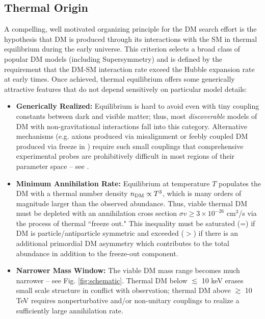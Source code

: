 \documentclass{article}
\begin{document}
\subsection{Thermal Origin}
A compelling, well motivated organizing principle for the DM search effort is the hypothesis that DM
is produced through its interactions with the SM in thermal equilibrium during the early universe. This criterion
selects a broad class of popular DM models (including Supersymmetry) and is defined by the requirement that the DM-SM 
interaction rate exceed the Hubble expansion rate at early times.  
Once achieved, thermal equilibrium offers some generically attractive features that do not depend sensitively
on particular model details:
\begin{itemize}
\item {\bf Generically Realized:} Equilibrium is hard to avoid even with tiny coupling constants  between 
dark and visible matter; thus, most {\it discoverable} models of DM with non-gravitational interactions fall into this category. 
Alternative mechanisms (e.g. axions produced via misalignment \cite{Visinelli:2009zm} or feebly coupled DM produced via freeze in \cite{Hall:2009bx}) require such small couplings
that comprehensive experimental probes are prohibitively difficult in most regions of their parameter space -- see \cite{Essig:2013lka}.
\item {\bf Minimum Annihilation Rate:}  Equilibrium at temperature $T$ populates the DM with a  thermal number density $n_{\rm DM} \propto T^3$, which is many orders of magnitude larger than the observed abundance. Thus, viable thermal DM must be depleted with an annihilation cross section $\sigma v \ge 3\times10^{-26}$ cm$^3$/s via
the process of thermal ``freeze out." This inequality must be saturated (=) if DM is particle/antiparticle symmetric and exceeded ($>$)  if there is an additional primordial DM asymmetry which contributes to the total abundance in addition to the freeze-out component.

\item {\bf Narrower Mass Window: }The viable DM mass range becomes much narrower -- see Fig. \ref{fig:schematic}.
Thermal DM below $\lesssim$ 10 keV erases small scale structure in conflict with observation; 
thermal DM above $\gtrsim$ 10 TeV requires nonperturbative and/or non-unitary couplings to realize
a sufficiently large annihilation rate. 
\end{itemize}
\end{document}
